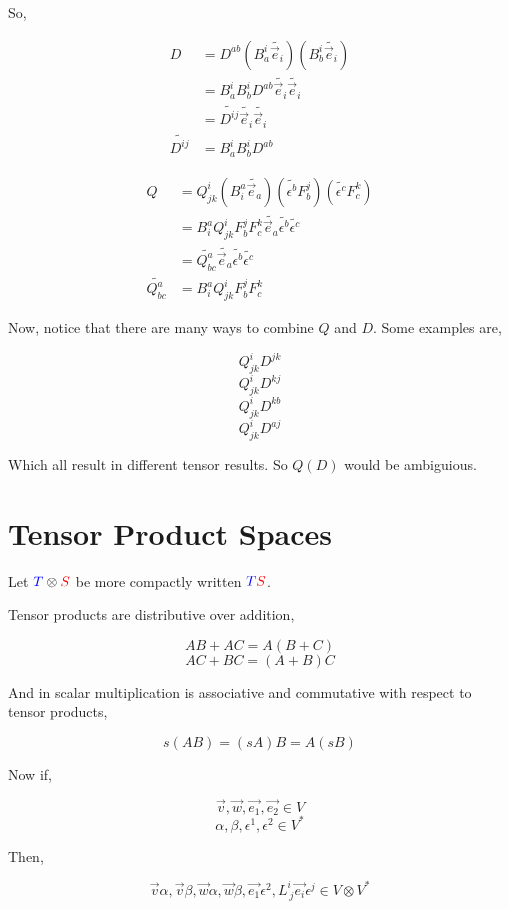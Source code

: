 \documentclass[12pt]{book}
\theoremstyle{plain}
\theoremstyle{definition}
\theoremstyle{ppart}
\theoremstyle{case}
\theoremstyle{solution}
\begin{document}
So,

\begin{align*}
  D &= D^{ab} (B^i_a \widetilde{\vec{e}_i}) (B^i_b \widetilde{\vec{e}_i}) \\
  &= B^i_a B^i_b D^{ab} \widetilde{\vec{e}_i} \widetilde{\vec{e}_i} \\
  &=  \widetilde{D^{ij}} \widetilde{\vec{e}_i} \widetilde{\vec{e}_i} \\
  \widetilde{D^{ij}} &= B^i_a B^i_b D^{ab}
\end{align*}

\begin{align*}
  Q &= Q^i_{jk} (B^a_i \widetilde{\vec{e}_a}) (\widetilde{\epsilon^b} F^j_b) (\widetilde{\epsilon^c} F^k_c) \\
  &= B^a_i Q^i_{jk} F^j_b F^k_c \widetilde{\vec{e}_a} \widetilde{\epsilon^b} \widetilde{\epsilon^c} \\
  &= \widetilde{Q^a_{bc}} \widetilde{\vec{e}_a} \widetilde{\epsilon^b} \widetilde{\epsilon^c} \\
  \widetilde{Q^a_{bc}} &= B^a_i Q^i_{jk} F^j_b F^k_c
\end{align*}

Now, notice that there are many ways to combine $Q$ and $D$. Some examples are,

\[ Q^i_{jk} D^{jk} \]
\[ Q^i_{jk} D^{kj} \]
\[ Q^i_{jk} D^{kb} \]
\[ Q^i_{jk} D^{aj} \]

Which all result in different tensor results. So $Q(D)$ would be ambiguious.

\section{Tensor Product Spaces}

Let ${\color{blue}T} \otimes {\color{red}S}$ be more compactly written ${\color{blue}T}{\color{red}S}$.

Tensor products are distributive over addition,

\[ AB + AC = A(B+C) \]
\[ AC + BC = (A+B)C \]

And in scalar multiplication is associative and commutative with respect to tensor products,

\[ s(AB) = (sA)B = A(sB) \]

Now if,

\[ \vec{v}, \vec{w}, \vec{e_1}, \vec{e_2} \in V \]
\[ \alpha, \beta, \epsilon^1, \epsilon^2 \in V^* \]

Then,

\[ \vec{v} \alpha, \vec{v} \beta, \vec{w} \alpha, \vec{w} \beta, \vec{e_1} \epsilon^2, L^i_{~j} \vec{e_i} \epsilon^j \in V \otimes V^* \]
\end{document}
